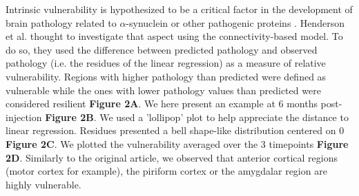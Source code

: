 Intrinsic vulnerability is hypothesized to be a critical factor in the development of brain pathology related to $\alpha$-synuclein or other pathogenic proteins \cite{Fu_2018}. Henderson et al. thought to investigate that aspect using the connectivity-based model. To do so, they used the difference between predicted pathology and observed pathology (i.e. the residues of the linear regression) as a measure of relative vulnerability. Regions with higher pathology than predicted were defined as vulnerable while the ones with lower pathology values than predicted were considered resilient \textbf{Figure 2A}. We here present an example at 6 months post-injection \textbf{Figure 2B}. We used a 'lollipop' plot to help appreciate the distance to linear regression. Residues presented a bell shape-like distribution centered on 0 \textbf{Figure 2C}. We plotted the vulnerability averaged over the 3 timepoints \textbf{Figure 2D}. Similarly to the original article, we observed that anterior cortical regions (motor cortex for example), the piriform cortex or the amygdalar region are highly vulnerable. \\

